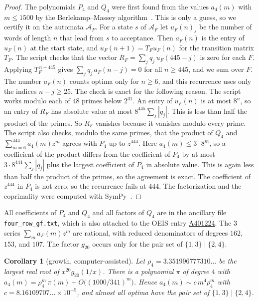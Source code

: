 \documentclass[12pt]{article}
\theoremstyle{plain}
\newtheorem{corollary}[theorem]{Corollary}
\theoremstyle{definition}
\theoremstyle{remark}
\newcommand{\seqnum}[1]{\href{https://oeis.org/#1}{\rm \underline{#1}}}
\begin{document}
\begin{proof}
The polynomials $P_4$ and $Q_4$ were first found from the values $a_4(m)$ with
$m\le1500$ by the Berlekamp--Massey algorithm~\cite{massey1969}. This is only a
guess, so we certify it on the automata $\mathcal A_F$. For a state $s$ of
$\mathcal A_F$ let $u_F(n)_s$ be the number of words of length $n$ that lead
from $s$ to acceptance. Then $a_F(n)$ is the entry of $u_F(n)$ at the start
state, and $u_F(n+1)=T_Fu_F(n)$ for the transition matrix $T_F$. The script
checks that the vector $R_F=\sum_jq_j\,u_F(445-j)$ is zero for each $F$. Applying
$T_F^{\,n-445}$ gives $\sum_jq_j\,a_F(n-j)=0$ for all $n\ge445$, and we sum over
$F$. The number $a_F(n)$ counts optima only for $n\ge6$, and this recurrence
uses only the indices $n-j\ge25$. The check is exact for the following reason. The script works modulo each
of $48$ primes below $2^{31}$. An entry of $u_F(n)$ is at most $8^n$, so an entry
of $R_F$ has absolute value at most $8^{445}\sum_j|q_j|$. This is less than half
the product of the primes. So $R_F$ vanishes because it vanishes modulo every
prime. The script also checks, modulo the same primes, that the product of
$Q_4$ and $\sum_{m=6}^{444}a_4(m)z^m$ agrees with $P_4$ up to $z^{444}$. Here
$a_4(m)\le3\cdot8^m$, so a coefficient of the product differs from the
coefficient of $P_4$ by at most $3\cdot8^{444}\sum_j|q_j|$ plus the largest
coefficient of $P_4$ in absolute value. This is again less than half the
product of the primes, so the agreement is exact. The coefficient of
$z^{444}$ in $P_4$ is not zero, so the recurrence fails at $444$. The
factorization and the coprimality were computed with SymPy~\cite{sympy2017}.
\end{proof}

All coefficients of $P_4$ and $Q_4$ and all factors of $Q_4$ are in the
ancillary file \nolinkurl{four_row_gf.txt}, which is also attached to the OEIS
entry \seqnum{A401224}. The $3$ series $\sum_ma_F(m)z^m$ are rational, with
reduced denominators of degrees $162$, $153$, and $107$. The factor $g_{20}$
occurs only for the pair set of $\{1,3\}\mid\{2,4\}$.

\begin{corollary}[growth, computer-assisted]\label{cor:fourgrowth}
Let $\rho_4=3.351996777310\ldots$ be the largest real root of
$x^{20}g_{20}(1/x)$. There is a polynomial $\pi$ of degree $4$ with
$a_4(m)=\rho_4^m\,\pi(m)+O\bigl((1000/341)^m\bigr)$. Hence
$a_4(m)\sim c\,m^4\rho_4^m$ with $c=8.16109707\ldots\times10^{-5}$, and almost all
optima have the pair set of $\{1,3\}\mid\{2,4\}$.
\end{corollary}
\end{document}
